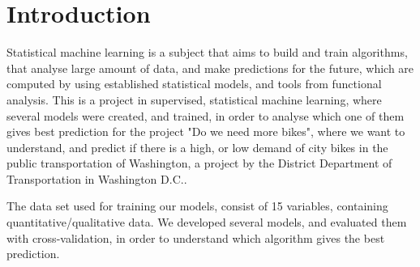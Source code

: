 \section{Introduction}
Statistical machine learning is a subject that aims to build and train algorithms, that analyse large amount of data, and make predictions for the future, which are computed by using established statistical models, and tools from functional analysis. This is a project in supervised, statistical machine learning, where several models were created, and trained, in order to analyse which one of them gives best prediction for the project "Do we need more bikes", where we want to understand, and predict if there is a high, or low demand of city bikes in the public transportation of Washington, a project by the District Department of Transportation in Washington D.C..

The data set used for training our models, consist of 15 variables, containing quantitative/qualitative data. We developed several models, and evaluated them with cross-validation, in order to understand which algorithm gives the best prediction. 
